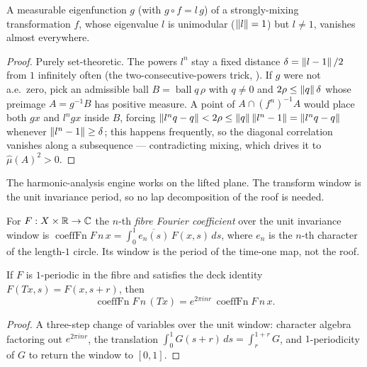 \begin{theorem}\label{thm:susp-eigZero}
  \leanok
  A measurable eigenfunction $g$ (with $g \circ f = l\,g$) of a strongly-mixing transformation $f$,
  whose eigenvalue $l$ is unimodular ($\left\lVert l \right\rVert = 1$) but $l \ne 1$, vanishes almost everywhere.
\end{theorem}
\begin{proof}\leanok
  Purely set-theoretic. The powers $l^n$ stay a fixed distance $\delta = \left\lVert l - 1 \right\rVert/2$ from $1$
  infinitely often (the two-consecutive-powers trick,
  ). If $g$ were not a.e.\ zero, pick an admissible
  ball $B = \operatorname{ball} q\,\rho$ with $q \ne 0$ and $2\rho \le \left\lVert q \right\rVert\delta$ whose
  preimage $A = g^{-1}B$ has positive measure. A point of $A \cap (f^n)^{-1}A$ would place both
  $g x$ and $l^n g x$ inside $B$, forcing $\left\lVert l^n q - q \right\rVert < 2\rho \le \left\lVert q \right\rVert\left\lVert l^n - 1 \right\rVert
  = \left\lVert l^n q - q \right\rVert$ whenever $\left\lVert l^n - 1 \right\rVert \ge \delta$; this happens frequently, so the diagonal
  correlation vanishes along a subsequence --- contradicting mixing, which drives it to
  $\hat\mu(A)^2 > 0$.
\end{proof}

The harmonic-analysis engine works on the lifted plane. The transform window is the unit invariance
period, so no lap decomposition of the roof is needed.

\begin{definition}\label{thm:susp-coeffFn}
  \leanok
  For $F : X \times \mathbb{R} \to \mathbb{C}$ the $n$-th \emph{fibre Fourier coefficient} over the unit invariance
  window is $\operatorname{coeffFn} F\,n\,x = \int_0^1 \overline{e_n(s)}\,F(x, s)\,ds$, where $e_n$
  is the $n$-th character of the length-$1$ circle. Its window is the period of the time-one map,
  not the roof.
\end{definition}

\begin{theorem}\label{thm:susp-twist}
  \leanok
  If $F$ is $1$-periodic in the fibre and satisfies the deck identity $F(Tx, s) = F(x, s + r)$, then
  \[
    \operatorname{coeffFn} F\,n\,(Tx) = e^{2\pi i n r}\,\operatorname{coeffFn} F\,n\,x.
  \]
\end{theorem}
\begin{proof}\leanok
  A three-step change of variables over the unit window: character algebra factoring out
  $e^{2\pi i n r}$, the translation $\int_0^1 G(s + r)\,ds = \int_r^{1+r} G$, and
  $1$-periodicity of $G$ to return the window to $[0, 1]$.
\end{proof}

